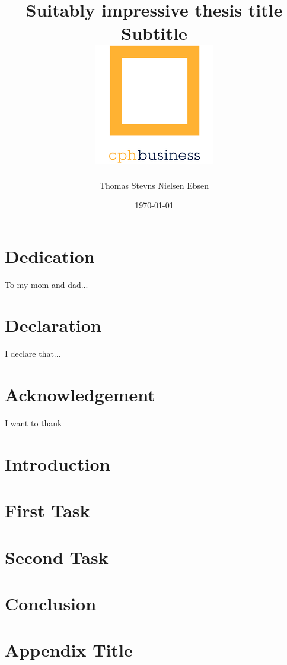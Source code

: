 \documentclass[12pt]{report}
\title{
    {Suitably impressive thesis title}\\
    {\large Subtitle}\\
    {\includegraphics{cphbusiness-small.png}}
}
\author{Thomas Stevns Nielsen Ebsen}
\date{\today}
\begin{document}




\chapter*{Dedication}
To my mom and dad...

\chapter*{Declaration}
I declare that...

\chapter*{Acknowledgement}
I want to thank

\tableofcontents
\listoffigures
\listoftables

\chapter{Introduction}


\chapter{First Task}


\chapter{Second Task}


\chapter{Conclusion}


\appendix
\chapter{Appendix Title}


\printbibliography
\end{document}
